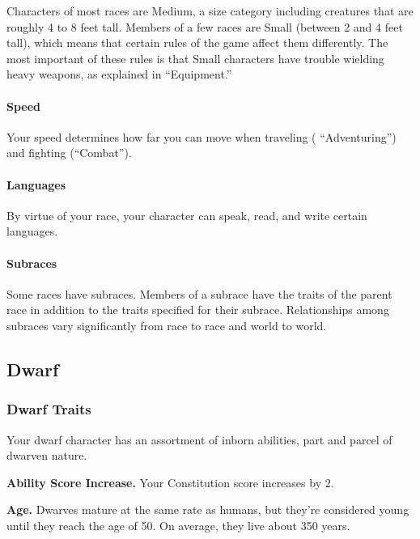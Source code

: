 \documentclass[
]{article}
\begin{document}
Characters of most races are Medium, a size category including creatures
that are roughly 4 to 8 feet tall. Members of a few races are Small
(between 2 and 4 feet tall), which means that certain rules of the game
affect them differently. The most important of these rules is that Small
characters have trouble wielding heavy weapons, as explained in
``Equipment.''

\hypertarget{speed}{%
\paragraph{Speed}\label{speed}}

Your speed determines how far you can move when traveling (
``Adventuring'') and fighting (``Combat'').

\hypertarget{languages}{%
\paragraph{Languages}\label{languages}}

By virtue of your race, your character can speak, read, and write
certain languages.

\hypertarget{subraces}{%
\paragraph{Subraces}\label{subraces}}

Some races have subraces. Members of a subrace have the traits of the
parent race in addition to the traits specified for their subrace.
Relationships among subraces vary significantly from race to race and
world to world.

\hypertarget{dwarf}{%
\subsection{Dwarf}\label{dwarf}}

\hypertarget{dwarf-traits}{%
\subsubsection{Dwarf Traits}\label{dwarf-traits}}

Your dwarf character has an assortment of inborn abilities, part and
parcel of dwarven nature.

\textbf{Ability Score Increase.} Your Constitution score increases by 2.

\textbf{Age.} Dwarves mature at the same rate as humans, but they're
considered young until they reach the age of 50. On average, they live
about 350 years.
\end{document}
